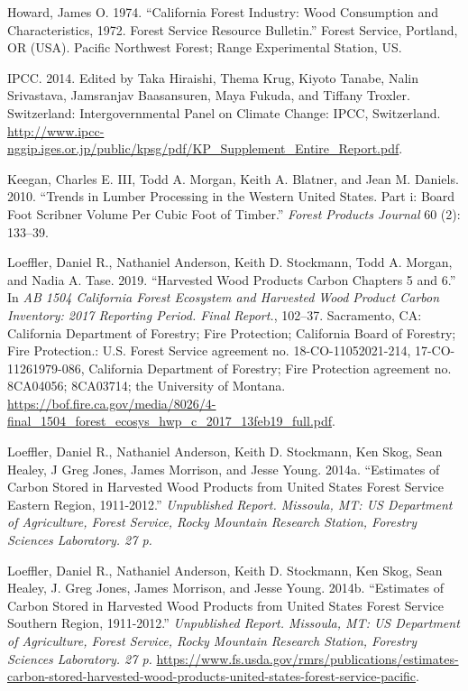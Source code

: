 \documentclass[
  openany]{book}
\newlength{\cslhangindent}
\newlength{\cslentryspacingunit} %
\newenvironment{CSLReferences}[2] %
 {%
  \setlength{\parindent}{0pt}
  \ifodd #1
  \let\oldpar\par
  \def\par{\hangindent=\cslhangindent\oldpar}
  \fi
  \setlength{\parskip}{#2\cslentryspacingunit}
 }%
 {}
\begin{document}
\begin{CSLReferences}{1}{0}
\leavevmode{}%
Howard, James O. 1974. {``California Forest Industry: Wood Consumption
and Characteristics, 1972. Forest Service Resource Bulletin.''} Forest
Service, Portland, OR (USA). Pacific Northwest Forest; Range
Experimental Station, US.

\leavevmode{}%
IPCC. 2014. Edited by Taka Hiraishi, Thema Krug, Kiyoto Tanabe, Nalin
Srivastava, Jamsranjav Baasansuren, Maya Fukuda, and Tiffany Troxler.
Switzerland: Intergovernmental Panel on Climate Change: IPCC,
Switzerland.
\url{http://www.ipcc-nggip.iges.or.jp/public/kpsg/pdf/KP_Supplement_Entire_Report.pdf}.

\leavevmode{}%
Keegan, Charles E. III, Todd A. Morgan, Keith A. Blatner, and Jean M.
Daniels. 2010. {``Trends in Lumber Processing in the Western United
States. Part i: Board Foot Scribner Volume Per Cubic Foot of Timber.''}
\emph{Forest Products Journal} 60 (2): 133--39.

\leavevmode{}%
Loeffler, Daniel R., Nathaniel Anderson, Keith D. Stockmann, Todd A.
Morgan, and Nadia A. Tase. 2019. {``Harvested Wood Products Carbon
Chapters 5 and 6.''} In \emph{AB 1504 California Forest Ecosystem and
Harvested Wood Product Carbon Inventory: 2017 Reporting Period. Final
Report.}, 102--37. Sacramento, CA: California Department of Forestry;
Fire Protection; California Board of Forestry; Fire Protection.: U.S.
Forest Service agreement no. 18-CO-11052021-214, 17-CO-11261979-086,
California Department of Forestry; Fire Protection agreement no.
8CA04056; 8CA03714; the University of Montana.
\url{https://bof.fire.ca.gov/media/8026/4-final_1504_forest_ecosys_hwp_c_2017_13feb19_full.pdf}.

\leavevmode{}%
Loeffler, Daniel R., Nathaniel Anderson, Keith D. Stockmann, Ken Skog,
Sean Healey, J Greg Jones, James Morrison, and Jesse Young. 2014a.
{``Estimates of Carbon Stored in Harvested Wood Products from United
States Forest Service Eastern Region, 1911-2012.''} \emph{Unpublished
Report. Missoula, MT: US Department of Agriculture, Forest Service,
Rocky Mountain Research Station, Forestry Sciences Laboratory. 27 p.}

\leavevmode{}%
Loeffler, Daniel R., Nathaniel Anderson, Keith D. Stockmann, Ken Skog,
Sean Healey, J. Greg Jones, James Morrison, and Jesse Young. 2014b.
{``Estimates of Carbon Stored in Harvested Wood Products from United
States Forest Service Southern Region, 1911-2012.''} \emph{Unpublished
Report. Missoula, MT: US Department of Agriculture, Forest Service,
Rocky Mountain Research Station, Forestry Sciences Laboratory. 27 p.}
\url{https://www.fs.usda.gov/rmrs/publications/estimates-carbon-stored-harvested-wood-products-united-states-forest-service-pacific}.


\end{CSLReferences}
\end{document}
